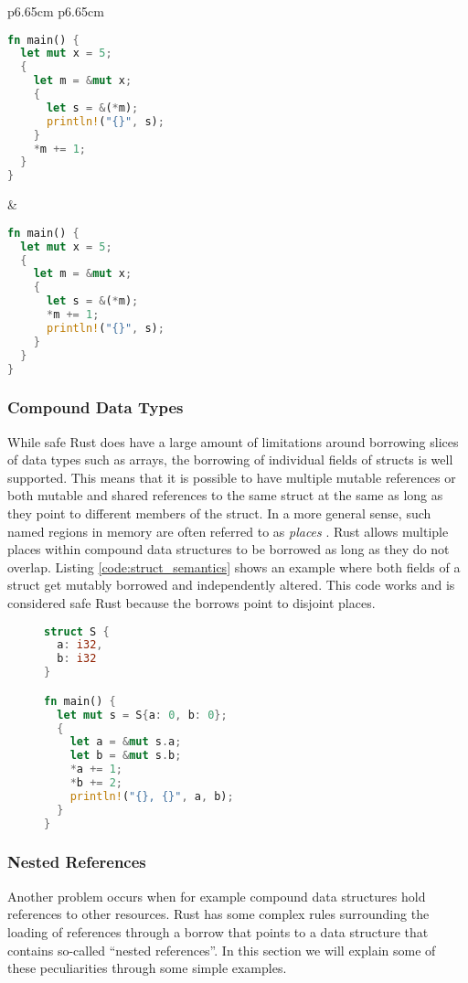 \noindent
\begin{tabular}{p{6.65cm} p{6.65cm}}
    \begin{lstlisting}[language=Rust,frame=single,caption=Reborrow example.,label=code:reborrow_semantics]
fn main() {
  let mut x = 5;
  {
    let m = &mut x;
    {
      let s = &(*m);
      println!("{}", s);
    }
    *m += 1;
  }
}
    \end{lstlisting}

    &

    \begin{lstlisting}[language=Rust,frame=single,caption=Wrong example.,label=code:reborrow_semantics_wrong]
fn main() {
  let mut x = 5;
  {
    let m = &mut x;
    {
      let s = &(*m);
      *m += 1;
      println!("{}", s);
    }
  }
}
    \end{lstlisting}
\end{tabular}

\subsubsection{Compound Data Types}
While safe Rust does have a large amount of limitations around borrowing slices of data types such as arrays, the borrowing of individual fields of structs is well supported.
This means that it is possible to have multiple mutable references or both mutable and shared references to the same struct at the same as long as they point to different members of the struct.
In a more general sense, such named regions in memory are often referred to as \textit{places} \cite{2019arXiv190300982W}.
Rust allows multiple places within compound data structures to be borrowed as long as they do not overlap.
Listing \ref{code:struct_semantics} shows an example where both fields of a struct get mutably borrowed and independently altered.
This code works and is considered safe Rust because the borrows point to disjoint places.

\begin{figure}[h]
\begin{lstlisting}[language=Rust,frame=single,caption=Borrowing struct fields.,label=code:struct_semantics]
struct S {
  a: i32,
  b: i32
}

fn main() {
  let mut s = S{a: 0, b: 0};
  {
    let a = &mut s.a;
    let b = &mut s.b;
    *a += 1;
    *b += 2;
    println!("{}, {}", a, b);
  }
}
\end{lstlisting}
\end{figure}

\subsubsection{Nested References}
\label{sec:rust_nested}
Another problem occurs when for example compound data structures hold references to other resources.
Rust has some complex rules surrounding the loading of references through a borrow that points to a data structure that contains so-called ``nested references''.
In this section we will explain some of these peculiarities through some simple examples.

